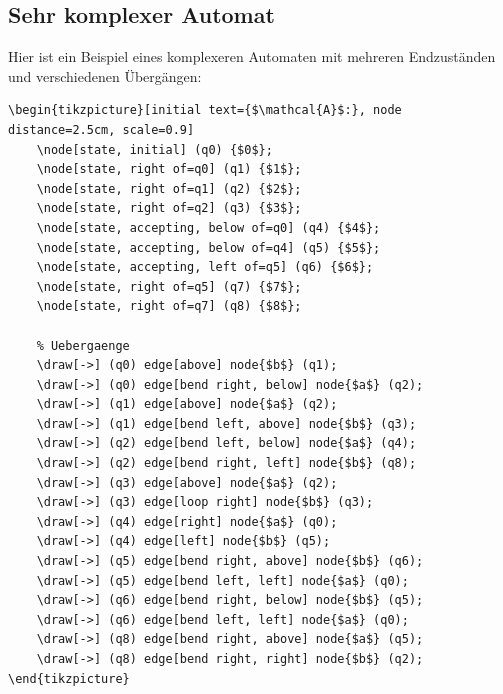 \subsection{Sehr komplexer Automat}

Hier ist ein Beispiel eines komplexeren Automaten mit mehreren Endzuständen und verschiedenen Übergängen:

\begin{lstlisting}[style=latex]
\begin{tikzpicture}[initial text={$\mathcal{A}$:}, node distance=2.5cm, scale=0.9]
	\node[state, initial] (q0) {$0$};
	\node[state, right of=q0] (q1) {$1$};
	\node[state, right of=q1] (q2) {$2$};
	\node[state, right of=q2] (q3) {$3$};
	\node[state, accepting, below of=q0] (q4) {$4$};
	\node[state, accepting, below of=q4] (q5) {$5$};
	\node[state, accepting, left of=q5] (q6) {$6$};
	\node[state, right of=q5] (q7) {$7$};
	\node[state, right of=q7] (q8) {$8$};
	
	% Uebergaenge
	\draw[->] (q0) edge[above] node{$b$} (q1);
	\draw[->] (q0) edge[bend right, below] node{$a$} (q2);
	\draw[->] (q1) edge[above] node{$a$} (q2);
	\draw[->] (q1) edge[bend left, above] node{$b$} (q3);
	\draw[->] (q2) edge[bend left, below] node{$a$} (q4);
	\draw[->] (q2) edge[bend right, left] node{$b$} (q8);
	\draw[->] (q3) edge[above] node{$a$} (q2);
	\draw[->] (q3) edge[loop right] node{$b$} (q3);
	\draw[->] (q4) edge[right] node{$a$} (q0);
	\draw[->] (q4) edge[left] node{$b$} (q5);
	\draw[->] (q5) edge[bend right, above] node{$b$} (q6);
	\draw[->] (q5) edge[bend left, left] node{$a$} (q0);
	\draw[->] (q6) edge[bend right, below] node{$b$} (q5);
	\draw[->] (q6) edge[bend left, left] node{$a$} (q0);
	\draw[->] (q8) edge[bend right, above] node{$a$} (q5);
	\draw[->] (q8) edge[bend right, right] node{$b$} (q2);
\end{tikzpicture}
\end{lstlisting}

